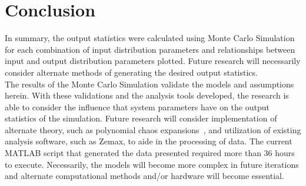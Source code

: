 \section{Conclusion}

In summary, the output statistics were calculated using Monte Carlo Simulation for each combination of input distribution parameters and relationships between input and output distribution parameters plotted. Future research will necessarily consider alternate methods of generating the desired output statistics. \\ 

The results of the Monte Carlo Simulation validate the models and assumptions herein. With these validations and the analysis tools developed, the research is able to consider the influence that system parameters have on the output statistics of the simulation. Future research will consider implementation of alternate theory, such as polynomial chaos expansions~\cite{xiu}, and utilization of existing analysis software, such as Zemax, to aide in the processing of data. The current MATLAB script that generated the data presented required more than 36 hours to execute. Necessarily, the models will become more complex in future iterations and alternate computational methods and/or hardware will become essential. \\